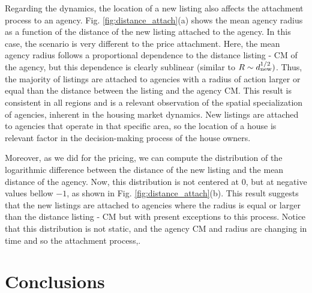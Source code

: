 Regarding the dynamics, the location of a new listing also affects the attachment process to an agency. Fig. \ref{fig:distance_attach}(a) shows the mean agency radius as a function of the distance of the new listing attached to the agency. In this case, the scenario is very different to the price attachment. Here, the mean agency radius follows a proportional dependence to the distance listing - CM of the agency, but this dependence is clearly sublinear (similar to $R \sim d_{\rm new}^{1/2})$. Thus, the majority of listings are attached to agencies with a radius of action larger or equal than the distance between the listing and the agency CM. This result is consistent in all regions and is a relevant observation of the spatial specialization of agencies, inherent in the housing market dynamics. New listings are attached to agencies that operate in that specific area, so the location of a house is relevant factor in the decision-making process of the house owners.

Moreover, as we did for the pricing, we can compute the distribution of the logarithmic difference between the distance of the new listing and the mean distance of the agency. Now, this distribution is not centered at $0$, but at negative values bellow $-1$, as shown in Fig. \ref{fig:distance_attach}(b). This result suggests that the new listings are attached to agencies where the radius is equal or larger than the distance listing - CM but with present exceptions to this process. Notice that this distribution is not static, and the agency CM and radius are changing in time and so the attachment process,. 


\section{Conclusions}


